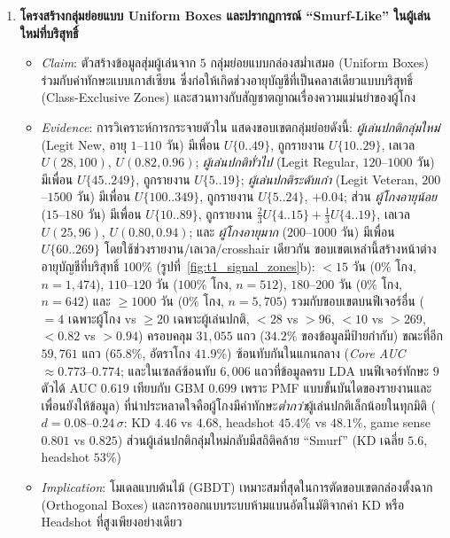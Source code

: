 \begin{enumerate}
  \item \textbf{โครงสร้างกลุ่มย่อยแบบ Uniform Boxes และปรากฏการณ์ ``Smurf-Like'' ในผู้เล่นใหม่ที่บริสุทธิ์}
  \begin{itemize}
    \item \emph{Claim}: ตัวสร้างข้อมูลสุ่มผู้เล่นจาก $5$ กลุ่มย่อยแบบกล่องสม่ำเสมอ (Uniform Boxes) ร่วมกับค่าทักษะแบบเกาส์เซียน ซึ่งก่อให้เกิดช่วงอายุบัญชีที่เป็นคลาสเดียวแบบบริสุทธิ์ (Class-Exclusive Zones) และสวนทางกับสัญชาตญาณเรื่องความแม่นยำของผู้โกง
    \item \emph{Evidence}: การวิเคราะห์การกระจายตัวใน  แสดงขอบเขตกลุ่มย่อยดังนี้:
      \emph{ผู้เล่นปกติกลุ่มใหม่} (Legit New, อายุ $1$--$110$ วัน) มีเพื่อน $U\{0..49\}$, ถูกรายงาน $U\{10..29\}$, เลเวล $U(28, 100)$,  $U(0.82, 0.96)$;
      \emph{ผู้เล่นปกติทั่วไป} (Legit Regular, $120$--$1000$ วัน) มีเพื่อน $U\{45..249\}$, ถูกรายงาน $U\{5..19\}$;
      \emph{ผู้เล่นปกติระดับเก๋า} (Legit Veteran, $200$--$1500$ วัน) มีเพื่อน $U\{100..349\}$, ถูกรายงาน $U\{5..24\}$,  $+0.04$;
      ส่วน \emph{ผู้โกงอายุน้อย} ($15$--$180$ วัน) มีเพื่อน $U\{10..89\}$, ถูกรายงาน $\frac{2}{3}U\{4..15\} + \frac{1}{3}U\{4..19\}$, เลเวล $U(25, 96)$,  $U(0.80, 0.94)$;
      และ \emph{ผู้โกงอายุมาก} ($200$--$1000$ วัน) มีเพื่อน $U\{60..269\}$ โดยใช้ช่วงรายงาน/เลเวล/crosshair เดียวกัน
      ขอบเขตเหล่านี้สร้างหน้าต่างอายุบัญชีที่บริสุทธิ์ $100\%$ (รูปที่~\ref{fig:t1_signal_zones}b): $<15$ วัน ($0\%$ โกง, $n = 1,474$), $110$--$120$ วัน ($100\%$ โกง, $n = 512$), $180$--$200$ วัน ($0\%$ โกง, $n = 642$) และ $\ge 1000$ วัน ($0\%$ โกง, $n = 5,705$) รวมกับขอบเขตบนฟีเจอร์อื่น ( $= 4$ เฉพาะผู้โกง vs $\ge 20$ เฉพาะผู้เล่นปกติ,  $< 28$ vs $> 96$,  $< 10$ vs $> 269$,  $< 0.82$ vs $> 0.94$) ครอบคลุม $31,055$ แถว ($34.2\%$ ของข้อมูลมีป้ายกำกับ) ขณะที่อีก $59,761$ แถว ($65.8\%$, อัตราโกง $41.9\%$) ซ้อนทับกันในแกนกลาง (\emph{Core AUC} $\approx 0.773$--$0.774$; และในเซลล์ซ้อนทับ $6,006$ แถวที่ข้อมูลครบ LDA บนฟีเจอร์ทักษะ $9$ ตัวได้ AUC $0.619$ เทียบกับ GBM $0.699$ เพราะ PMF แบบขั้นบันไดของรายงานและเพื่อนยังให้ข้อมูล) ที่น่าประหลาดใจคือผู้โกงมีค่าทักษะ\emph{ต่ำกว่า}ผู้เล่นปกติเล็กน้อยในทุกมิติ ($d = 0.08$--$0.24\,\sigma$: KD $4.46$ vs $4.68$, headshot $45.4\%$ vs $48.1\%$, game sense $0.801$ vs $0.825$) ส่วนผู้เล่นปกติกลุ่มใหม่กลับมีสถิติคล้าย ``Smurf'' (KD เฉลี่ย $5.6$, headshot $53\%$)
    \item \emph{Implication}: โมเดลแบบต้นไม้ (GBDT) เหมาะสมที่สุดในการตัดขอบเขตกล่องตั้งฉาก (Orthogonal Boxes) และการออกแบบระบบห้ามแบนอัตโนมัติจากค่า KD หรือ Headshot ที่สูงเพียงอย่างเดียว
  \end{itemize}


\end{enumerate}
